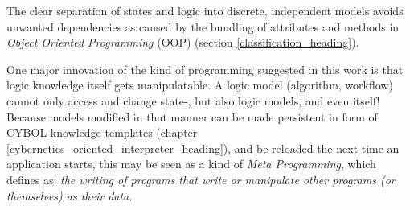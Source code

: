 The clear separation of states and logic into discrete, independent models
avoids unwanted dependencies as caused by the bundling of attributes and
methods in \emph{Object Oriented Programming} (OOP) (section
\ref{classification_heading}).

One major innovation of the kind of programming suggested in this work is that
logic knowledge itself gets manipulatable. A logic model (algorithm, workflow)
cannot only access and change state-, but also logic models, and even itself!
Because models modified in that manner can be made persistent in form of CYBOL
knowledge templates (chapter \ref{cybernetics_oriented_interpreter_heading}),
and be reloaded the next time an application starts, this may be seen as a kind
of \emph{Meta Programming}, which \cite{wikipedia} defines as: \textit{the
writing of programs that write or manipulate other programs (or themselves) as
their data.}
